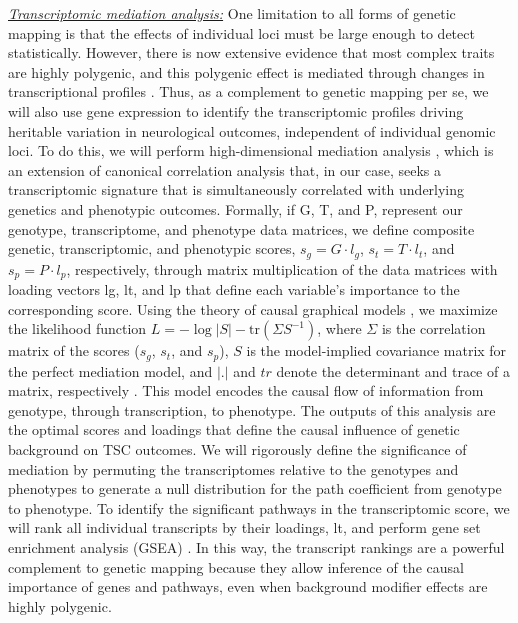 \documentclass[
  12pt,
]{article}
\begin{document}
\textit{\underline{Transcriptomic mediation analysis:}} One limitation
to all forms of genetic mapping is that the effects of individual loci
must be large enough to detect statistically. However, there is now
extensive evidence that most complex traits are highly polygenic, and
this polygenic effect is mediated through changes in transcriptional
profiles \cite{28622505, 31051098}. Thus, as a complement to genetic
mapping per se, we will also use gene expression to identify the
transcriptomic profiles driving heritable variation in neurological
outcomes, independent of individual genomic loci. To do this, we will
perform high-dimensional mediation analysis \cite{28637279}, which is an
extension of canonical correlation analysis that, in our case, seeks a
transcriptomic signature that is simultaneously correlated with
underlying genetics and phenotypic outcomes. Formally, if G, T, and P,
represent our genotype, transcriptome, and phenotype data matrices, we
define composite genetic, transcriptomic, and phenotypic scores,
\(s_g = G \cdot l_g\), \(s_t = T \cdot l_t\), and \(s_p = P \cdot l_p\),
respectively, through matrix multiplication of the data matrices with
loading vectors lg, lt, and lp that define each variable's importance to
the corresponding score. Using the theory of causal graphical models
\cite{21218138, 22496633}, we maximize the likelihood function
\(L = -\log|S| - \mathrm{tr}(\Sigma S^{-1})\), where \(\Sigma\) is the
correlation matrix of the scores (\(s_g\), \(s_t\), and \(s_p\)), \(S\)
is the model-implied covariance matrix for the perfect mediation model,
and \(|.|\) and \(tr\) denote the determinant and trace of a matrix,
respectively \cite{bollen_structural_1989}. This model encodes the
causal flow of information from genotype, through transcription, to
phenotype. The outputs of this analysis are the optimal scores and
loadings that define the causal influence of genetic background on TSC
outcomes. We will rigorously define the significance of mediation by
permuting the transcriptomes relative to the genotypes and phenotypes to
generate a null distribution for the path coefficient from genotype to
phenotype. To identify the significant pathways in the transcriptomic
score, we will rank all individual transcripts by their loadings, lt,
and perform gene set enrichment analysis (GSEA) \cite{16199517}. In this
way, the transcript rankings are a powerful complement to genetic
mapping because they allow inference of the causal importance of genes
and pathways, even when background modifier effects are highly
polygenic.
\end{document}
